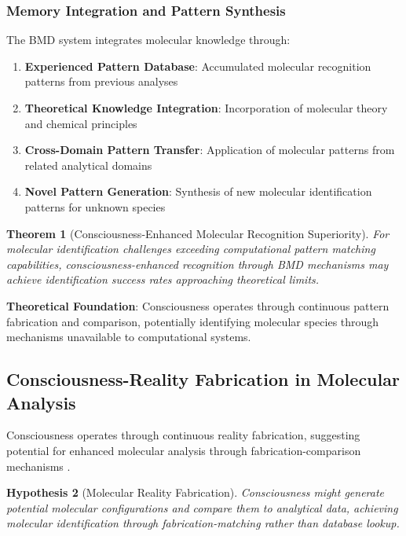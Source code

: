\documentclass[11pt,a4paper]{article}
\newtheorem{theorem}{Theorem}[section]
\newtheorem{hypothesis}[theorem]{Hypothesis}
\theoremstyle{remark}
\begin{document}
\subsubsection{Memory Integration and Pattern Synthesis}

The BMD system integrates molecular knowledge through:

\begin{enumerate}
\item \textbf{Experienced Pattern Database}: Accumulated molecular recognition patterns from previous analyses
\item \textbf{Theoretical Knowledge Integration}: Incorporation of molecular theory and chemical principles
\item \textbf{Cross-Domain Pattern Transfer}: Application of molecular patterns from related analytical domains
\item \textbf{Novel Pattern Generation}: Synthesis of new molecular identification patterns for unknown species
\end{enumerate}

\begin{theorem}[Consciousness-Enhanced Molecular Recognition Superiority]
For molecular identification challenges exceeding computational pattern matching capabilities, consciousness-enhanced recognition through BMD mechanisms may achieve identification success rates approaching theoretical limits.
\end{theorem}

\textbf{Theoretical Foundation}: Consciousness operates through continuous pattern fabrication and comparison, potentially identifying molecular species through mechanisms unavailable to computational systems.

\subsection{Consciousness-Reality Fabrication in Molecular Analysis}

Consciousness operates through continuous reality fabrication, suggesting potential for enhanced molecular analysis through fabrication-comparison mechanisms \cite{sachikonye2024consciousness}.

\begin{hypothesis}[Molecular Reality Fabrication]
Consciousness might generate potential molecular configurations and compare them to analytical data, achieving molecular identification through fabrication-matching rather than database lookup.
\end{hypothesis}
\end{document}
